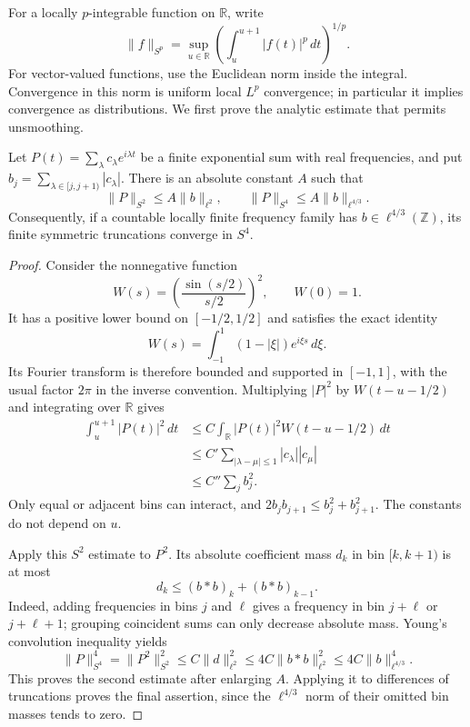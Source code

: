 For a locally $p$-integrable function on $\mathbb R$, write
\[
 \|f\|_{S^p}=\sup_{u\in\mathbb R}
           \left(\int_u^{u+1}|f(t)|^p\,dt\right)^{1/p}.
\]
For vector-valued functions, use the Euclidean norm inside the integral.
Convergence in this norm is uniform local $L^p$ convergence; in particular
it implies convergence as distributions.  We first prove the analytic
estimate that permits unsmoothing.

\begin{lemma}
\label{lem:pf-bins}
Let $P(t)=\sum_\lambda c_\lambda e^{i\lambda t}$ be a finite exponential
sum with real frequencies, and put
$b_j=\sum_{\lambda\in[j,j+1)}|c_\lambda|$.  There is an absolute constant
$A$ such that
\begin{equation}
\label{eq:pf-bins}
 \|P\|_{S^2}\leq A\|b\|_{\ell^2},
 \qquad
 \|P\|_{S^4}\leq A\|b\|_{\ell^{4/3}}.
\end{equation}
Consequently, if a countable locally finite frequency family has
$b\in\ell^{4/3}(\mathbb Z)$, its finite symmetric truncations converge in
$S^4$.
\end{lemma}

\begin{proof}
Consider the nonnegative function
\[
 W(s)=\left(\frac{\sin(s/2)}{s/2}\right)^2,
 \qquad W(0)=1.
\]
It has a positive lower bound on $[-1/2,1/2]$ and satisfies the exact
identity
\[
 W(s)=\int_{-1}^1(1-|\xi|)e^{i\xi s}\,d\xi.
\]
Its Fourier transform is therefore bounded and supported in $[-1,1]$,
with the usual factor $2\pi$ in the inverse convention.  Multiplying
$|P|^2$ by $W(t-u-1/2)$ and integrating over $\mathbb R$ gives
\begin{align*}
 \int_u^{u+1}|P(t)|^2\,dt
 &\leq C\int_{\mathbb R}|P(t)|^2W(t-u-1/2)\,dt\\
 &\leq C'\sum_{|\lambda-\mu|\leq1}
                             |c_\lambda||c_\mu|\\
 &\leq C''\sum_j b_j^2.
\end{align*}
Only equal or adjacent bins can interact, and
$2b_jb_{j+1}\leq b_j^2+b_{j+1}^2$.  The constants do not depend on $u$.

Apply this $S^2$ estimate to $P^2$.  Its absolute coefficient mass $d_k$
in bin $[k,k+1)$ is at most
\[
 d_k\leq(b*b)_k+(b*b)_{k-1}.
\]
Indeed, adding frequencies in bins $j$ and $\ell$ gives a frequency in
bin $j+\ell$ or $j+\ell+1$; grouping coincident sums can only decrease
absolute mass.  Young's convolution inequality yields
\[
 \|P\|_{S^4}^4
   =\|P^2\|_{S^2}^2
   \leq C\|d\|_{\ell^2}^2
   \leq4C\|b*b\|_{\ell^2}^2
   \leq4C\|b\|_{\ell^{4/3}}^4.
\]
This proves the second estimate after enlarging $A$.  Applying it to
differences of truncations proves the final assertion, since the
$\ell^{4/3}$ norm of their omitted bin masses tends to zero.
\end{proof}

